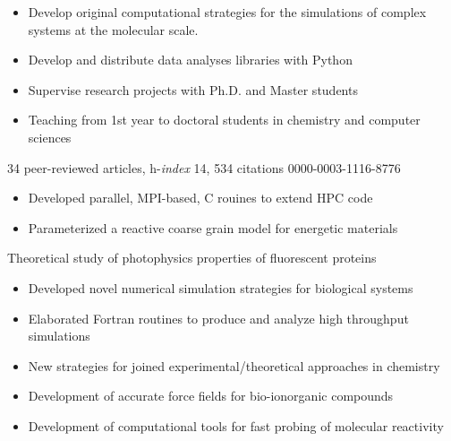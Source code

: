 \documentclass[10pt,a4paper,ragged2e,academicons]{../cvDev/altacv}
\begin{document}
\begin{itemize}
\item Develop original computational strategies for the simulations of complex systems
at the molecular scale.
\item Develop and distribute data analyses libraries with Python
\item Supervise research projects with Ph.D. and Master students
\item Teaching from 1st year to doctoral students in chemistry and computer sciences
\end{itemize}
{\small 34 peer-reviewed articles, h-\textit{index} 14, 534 citations \hfill \hspace{-1ex}\aiOrcid{} 0000-0003-1116-8776}

\divider

\begin{itemize}
\item Developed parallel, MPI-based, C rouines to extend HPC code
\item Parameterized a reactive coarse grain model for energetic materials
\end{itemize}

\divider

Theoretical study of photophysics properties of fluorescent proteins
\smallskip
\begin{itemize}
\item Developed novel numerical simulation strategies for biological systems 
\item Elaborated Fortran routines to produce and analyze high throughput simulations
\end{itemize}



\vspace{-1mm}
\begin{itemize}
\item New strategies for joined experimental/theoretical approaches in chemistry
\item Development of accurate force fields for bio-ionorganic compounds
\item Development of computational tools for fast probing of molecular reactivity
\end{itemize}
\end{document}
